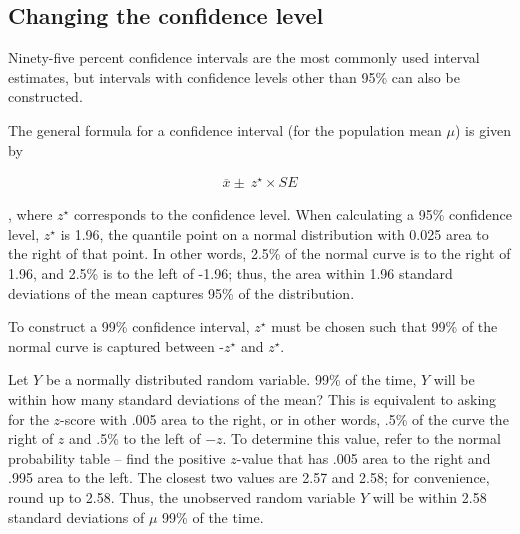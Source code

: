 \begin{spacing}{1.5}
\subsection{Changing the confidence level}
\label{changingTheConfidenceLevelSection}





Ninety-five percent confidence intervals are the most commonly used interval estimates, but intervals with confidence levels other than 95\% can also be constructed.

The general formula for a confidence interval (for the population mean $\mu$) is given by 

\begin{align}
	\overline{x} \pm \ z^{\star} \times SE
\end{align}

, where $z^{\star}$ corresponds to the confidence level. When calculating a 95\% confidence level, $z^{\star}$ is 1.96, the quantile point on a normal distribution with 0.025 area to the right of that point. In other words, 2.5\% of the normal curve is to the right of 1.96, and 2.5\% is to the left of -1.96; thus, the area within 1.96 standard deviations of the mean captures 95\% of the distribution.

To construct a 99\% confidence interval, $z^{\star}$ must be chosen such that 99\% of the normal curve is captured between -$z^{\star}$ and $z^{\star}$.

\begin{example}{Let $Y$ be a normally distributed random variable. 99\% of the time, $Y$ will be within how many standard deviations of the mean?}
	This is equivalent to asking for the $z$-score with .005 area to the right, or in other words, .5\% of the curve the right of $z$ and .5\% to the left of $-z$. To determine this value, refer to the normal probability table -- find the positive $z$-value that has .005 area to the right and .995 area to the left. The closest two values are 2.57 and 2.58; for convenience, round up to 2.58. Thus, the unobserved random variable $Y$ will be within 2.58 standard deviations of $\mu$ 99\% of the time.
\end{example}


\end{spacing}

